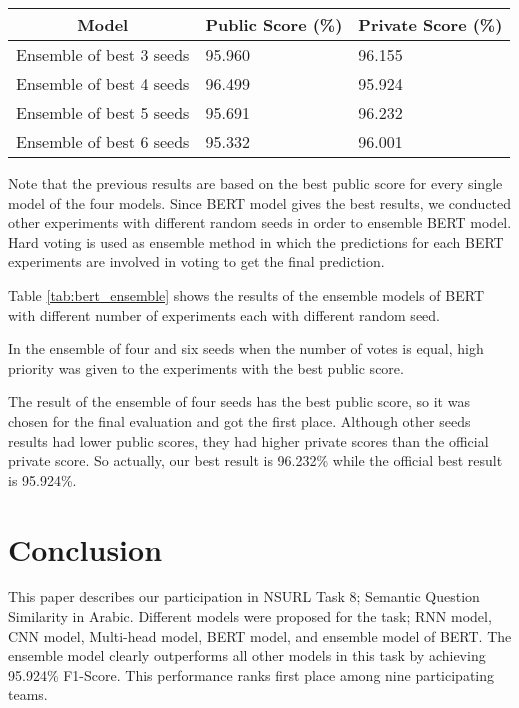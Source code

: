 \documentclass[11pt,a4paper]{article}
\begin{document}
\begin{table*}
\centering
\begin{tabular}{|l|l|l|}
\hline
\multicolumn{1}{|c|}{Model}   & \multicolumn{1}{c|}{  Public Score  (\%)}  & \multicolumn{1}{c|}{ Private Score (\%)}   \\ \hline
 
  Ensemble of best 3 seeds  & 95.960  & 96.155  \\ \hline
  Ensemble of best 4 seeds  & 96.499  & 95.924  \\ \hline
  Ensemble of best 5 seeds  & 95.691  & 96.232 \\ \hline
  Ensemble of best 6 seeds  & 95.332  & 96.001  \\ \hline
 
\end{tabular}
\caption{BERT Ensemble Results}
\label{tab:bert_ensemble}
\end{table*}

Note that the previous results are based on the best public score for every single model of the four models. Since BERT model gives the best results, we conducted other experiments with different random seeds in order to ensemble BERT model. Hard voting is used as ensemble method in which the predictions for each BERT experiments are involved in voting to get the final prediction.

Table \ref{tab:bert_ensemble} shows the results of the ensemble models of BERT with different number of experiments each with different random seed.




In the ensemble of four and six seeds when the number of votes is equal, high priority was given to the experiments with the best public score.

The result of the ensemble of four seeds has the best public score, so it was chosen for the final evaluation and got the first place. Although other seeds results had lower public scores, they had higher private scores than the official private score. So actually, our best result is 96.232\% while the official best result is 95.924\%.


\vspace{0.25in}
\section{Conclusion}
This paper describes our participation in NSURL Task 8; Semantic Question Similarity in Arabic.
Different models were proposed for the task; RNN model, CNN model, Multi-head model, BERT model, and ensemble model of BERT. The ensemble model clearly outperforms all other models in this task by achieving 95.924\% F1-Score. This performance ranks first place among nine participating teams. 




\end{document}

